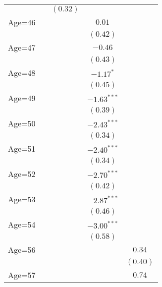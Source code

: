 \documentclass[fullpage]{paper}
\begin{document}
\begin{center}
\begin{longtable}{l c c c c }
            &               & $(0.32)$      &               &               \\
Age=46      &               &               & $0.01$        &               \\
            &               &               & $(0.42)$      &               \\
Age=47      &               &               & $-0.46$       &               \\
            &               &               & $(0.43)$      &               \\
Age=48      &               &               & $-1.17^{*}$   &               \\
            &               &               & $(0.45)$      &               \\
Age=49      &               &               & $-1.63^{***}$ &               \\
            &               &               & $(0.39)$      &               \\
Age=50      &               &               & $-2.43^{***}$ &               \\
            &               &               & $(0.34)$      &               \\
Age=51      &               &               & $-2.40^{***}$ &               \\
            &               &               & $(0.34)$      &               \\
Age=52      &               &               & $-2.70^{***}$ &               \\
            &               &               & $(0.42)$      &               \\
Age=53      &               &               & $-2.87^{***}$ &               \\
            &               &               & $(0.46)$      &               \\
Age=54      &               &               & $-3.00^{***}$ &               \\
            &               &               & $(0.58)$      &               \\
Age=56      &               &               &               & $0.34$        \\
            &               &               &               & $(0.40)$      \\
Age=57      &               &               &               & $0.74$        \\

\end{longtable}
\end{center}
\end{document}
